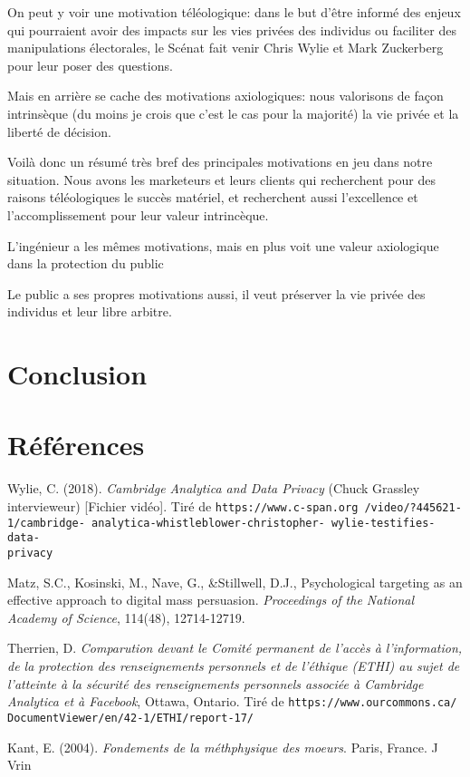 \documentclass[11pt]{article}
\newcommand{\philnewpage}{}
\begin{document}
On peut y voir une motivation téléologique: dans le but d'être informé des
enjeux qui pourraient avoir des impacts sur les vies privées des individus ou
faciliter des manipulations électorales, le Scénat fait venir Chris Wylie et
Mark Zuckerberg pour leur poser des questions.

Mais en arrière se cache des motivations axiologiques: nous valorisons de façon
intrinsèque (du moins je crois que c'est le cas pour la majorité) la vie privée
et la liberté de décision.

Voilà donc un résumé très bref des principales motivations en jeu dans notre
situation.  Nous avons les marketeurs et leurs clients qui recherchent pour des
raisons téléologiques le succès matériel, et recherchent aussi l'excellence et
l'accomplissement pour leur valeur intrincèque.

L'ingénieur a les mêmes motivations, mais en plus voit une valeur axiologique
dans la protection du public

Le public a ses propres motivations aussi, il veut préserver la vie privée des
individus et leur libre arbitre.

\philnewpage
\section{Conclusion}
\newpage
\section*{Références}
\setlength{\parindent}{0in}
\singlespacing

    
\singlespacing
Wylie, C. (2018). \emph{Cambridge Analytica and Data Privacy} (Chuck
Grassley intervieweur) [Fichier vidéo].  Tiré de
\texttt{https:\allowbreak/\allowbreak /www.c-span.org\allowbreak
/video\allowbreak /?445621-1\allowbreak /cambridge-\allowbreak
analytica-\allowbreak whistleblower-\allowbreak christopher-\allowbreak
wylie-\allowbreak testifies-\allowbreak data-\\privacy}

\singlespacing
Matz, S.C., Kosinski, M., Nave, G., \&Stillwell, D.J., {Psychological targeting as an effective approach to digital mass persuasion}. \emph{Proceedings of the National Academy of Science}, 114(48), 12714-12719.

\singlespacing
Therrien, D. \emph{Comparution devant le Comité permanent de l’accès à
l’information, de la protection des renseignements personnels et de l’éthique
(ETHI) au sujet de l’atteinte à la sécurité des renseignements personnels
associée à Cambridge Analytica et à Facebook}, Ottawa, Ontario.  Tiré de
\texttt{https://\allowbreak www.\allowbreak ourcommons.\allowbreak ca/\allowbreak
DocumentViewer/\allowbreak en/42-1/\allowbreak ETHI/\allowbreak report-17/}

\singlespacing
Kant, E. (2004). \emph{Fondements de la méthphysique des moeurs}. Paris, France.
J Vrin
\end{document}
